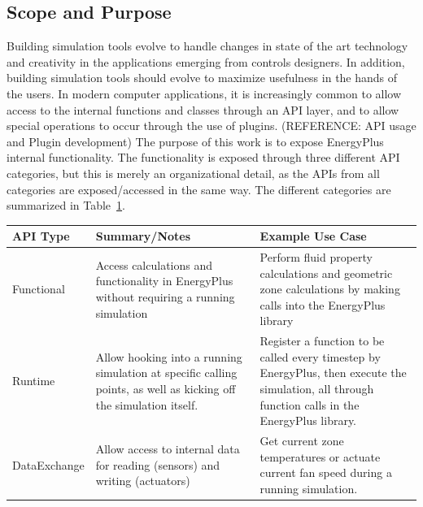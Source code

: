 \documentclass[5p]{elsarticle}
\begin{document}
  \subsection{Scope and Purpose}
Building simulation tools evolve to handle changes in state of the art technology and creativity in the applications emerging from controls designers.  In addition, building simulation tools should evolve to maximize usefulness in the hands of the users.  In modern computer applications, it is increasingly common to allow access to the internal functions and classes through an API layer, and to allow special operations to occur through the use of plugins.  (REFERENCE: API usage and Plugin development)  The purpose of this work is to expose EnergyPlus internal functionality.  The functionality is exposed through three different API categories, but this is merely an organizational detail, as the APIs from all categories are exposed/accessed in the same way.  The different categories are summarized in Table~\ref{table:api:uses:classes}.

\begin{table}
\begin{center}
\begin{tabular}{@{}p{1.25in}p{2.5in}p{2.5in}@{}}
\toprule
API Type     & Summary/Notes & Example Use Case                                                                                                                                  \\ 
\midrule
Functional   & Access calculations and functionality in EnergyPlus without requiring a running simulation & Perform fluid property calculations and geometric zone calculations by making calls into the EnergyPlus library \\
Runtime      & Allow hooking into a running simulation at specific calling points, as well as kicking off the simulation itself. & Register a function to be called every timestep by EnergyPlus, then execute the simulation, all through function calls in the EnergyPlus library. \\
DataExchange & Allow access to internal data for reading (sensors) and writing (actuators) & Get current zone temperatures or actuate current fan speed during a running simulation.                                                           \\ 
\bottomrule
\end{tabular}
\label{table:api:uses:classes}
\end{center}
\end{table}
\end{document}
